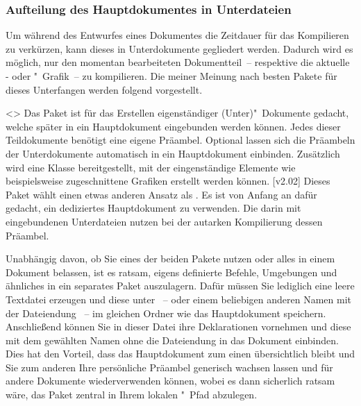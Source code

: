 \subsubsection{Aufteilung des Hauptdokumentes in Unterdateien}
%
Um während des Entwurfes eines Dokumentes die Zeitdauer für das Kompilieren zu 
verkürzen, kann dieses in Unterdokumente gegliedert werden. Dadurch wird es 
möglich, nur den momentan bearbeiteten Dokumentteil~-- respektive die aktuelle 
- oder "~Grafik~-- zu kompilieren. Die meiner 
Meinung nach besten Pakete für dieses Unterfangen werden folgend vorgestellt.

\begin{DeclarePackages}
<>
  Das Paket ist für das Erstellen eigenständiger (Unter)"~Dokumente gedacht, 
  welche später in ein Hauptdokument eingebunden werden können. Jedes dieser 
  Teildokumente benötigt eine eigene Präambel. Optional lassen sich die 
  Präambeln der Unterdokumente automatisch in ein Hauptdokument einbinden. 
  Zusätzlich wird eine Klasse bereitgestellt, mit der eingenständige Elemente 
  wie beispielsweise zugeschnittene Grafiken erstellt werden können.
[v2.02]
  Dieses Paket wählt einen etwas anderen Ansatz als . Es 
  ist von Anfang an dafür gedacht, ein dediziertes Hauptdokument zu verwenden. 
  Die darin mit  eingebundenen Unterdateien nutzen bei der 
  autarken Kompilierung dessen Präambel.
\end{DeclarePackages}

Unabhängig davon, ob Sie eines der beiden Pakete nutzen oder alles in einem 
Dokument belassen, ist es ratsam, eigens definierte Befehle, Umgebungen und 
ähnliches in ein separates Paket auszulagern. Dafür müssen Sie lediglich eine 
leere Textdatei erzeugen und diese unter ~-- oder einem 
beliebigen anderen Namen mit der Dateiendung ~-- im gleichen Ordner 
wie das Hauptdokument speichern. Anschließend können Sie in dieser Datei ihre 
Deklarationen vornehmen und diese mit dem gewählten Namen ohne die Dateiendung
 in das Dokument einbinden. Dies hat 
den Vorteil, dass das Hauptdokument zum einen übersichtlich bleibt und Sie zum 
anderen Ihre persönliche Präambel generisch wachsen lassen und für andere 
Dokumente wiederverwenden können, wobei es dann sicherlich ratsam wäre, das 
Paket zentral in Ihrem lokalen "~Pfad abzulegen. 



